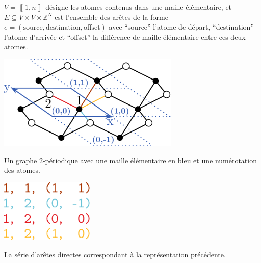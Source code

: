 \documentclass{article}
\newcommand{\llbra}{\left\llbracket}
\newcommand{\rrbra}{\right\rrbracket}
\renewcommand{\brack}[1]{\ensuremath{\llbra#1\rrbra}}
\newcommand{\Z}{\mathbb{Z}}
\begin{document}
$V = \brack{1,n}$ désigne les atomes contenus dans une maille élémentaire, et $E\subseteq V\times V\times \Z^N$ est l'ensemble des arêtes de la forme $e = (\text{source}, \text{destination}, \text{offset})$ avec ``source'' l'atome de départ, ``destination'' l'atome d'arrivée et ``offset'' la différence de maille élémentaire entre ces deux atomes.

\vspace{1em}
%
\begin{minipage}[t]{0.55\textwidth}
	\centering
	\includegraphics[height=4.5cm]{../figures/topologicalkeys2.pdf}
	
	Un graphe $2$-périodique avec une maille élémentaire en bleu et une numérotation des atomes.
\end{minipage}%
\begin{minipage}[t]{0.45\textwidth}
	\centering
	\includegraphics[height=3cm]{../figures/topologicalkeys3.pdf}

	La série d'arêtes directes correspondant à la représentation précédente.
\end{minipage}
\end{document}
